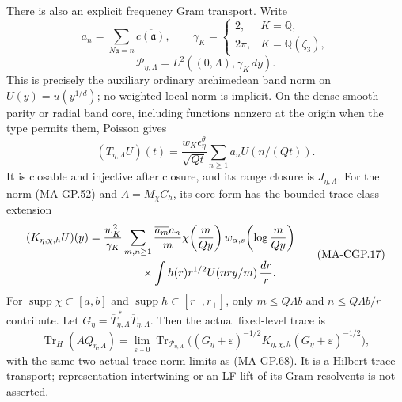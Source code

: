 There is also an explicit frequency Gram transport.  Write
\[
 a_n=\sum_{N\mathfrak a=n}\overline{c(\mathfrak a)},\qquad
 \gamma_K=\begin{cases}2,&K=\mathbb Q,\\2\pi,&K=\mathbb Q(\zeta_3),\end{cases}
\]
\[
 \mathcal P_{\eta,\Lambda}=L^2((0,\Lambda),\gamma_K\,dy).
 \tag{MA-CGP.15}
\]
This is precisely the auxiliary ordinary archimedean band
norm on $U(y)=u(y^{1/d})$; no weighted local norm is implicit.
On the dense smooth parity or radial band core, including
functions nonzero at the origin when the type permits them,
Poisson gives
\[
 (T_{\eta,\Lambda}U)(t)
   =\frac{w_K\epsilon_\eta^\theta}{\sqrt{Qt}}
                      \sum_{n\ge1}a_n U(n/(Qt)).
 \tag{MA-CGP.16}
\]
It is closable and injective after closure, and its range
closure is $J_{\eta,\Lambda}$.
For the norm (MA-GP.52) and $A=M_\chi C_h$, its core form
has the bounded trace-class extension
\[
 \begin{aligned}
 (K_{\eta,\chi,h}U)(y)
   ={}&\frac{w_K^2}{\gamma_K}
      \sum_{m,n\ge1}\frac{\overline{a_m}a_n}{m}
       \chi\!\left(\frac{m}{Qy}\right)
       w_{\alpha,s}\!\left(\log\frac{m}{Qy}\right)\\
      &\hspace{12mm}\times
       \int h(r)r^{1/2}U(nry/m)\,\frac{dr}{r}.
 \end{aligned}
 \tag{MA-CGP.17}
\]
For $\operatorname{supp}\chi\subset[a,b]$ and
$\operatorname{supp}h\subset[r_-,r_+]$, only
$m\le Q\Lambda b$ and $n\le Q\Lambda b/r_-$ contribute.
Let $G_\eta=\overline T_{\eta,\Lambda}^{\,*}\overline T_{\eta,\Lambda}$.
Then the actual fixed-level trace is
\[
 \operatorname{Tr}_H(AQ_{\eta,\Lambda})
    =\lim_{\varepsilon\downarrow0}
       \operatorname{Tr}_{\mathcal P_{\eta,\Lambda}}
       \bigl((G_\eta+\varepsilon)^{-1/2}
                K_{\eta,\chi,h}(G_\eta+\varepsilon)^{-1/2}\bigr),
 \tag{MA-CGP.18}
\]
with the same two actual trace-norm limits as (MA-GP.68).
It is a Hilbert trace transport; representation intertwining
or an LF lift of its Gram resolvents is not asserted.

